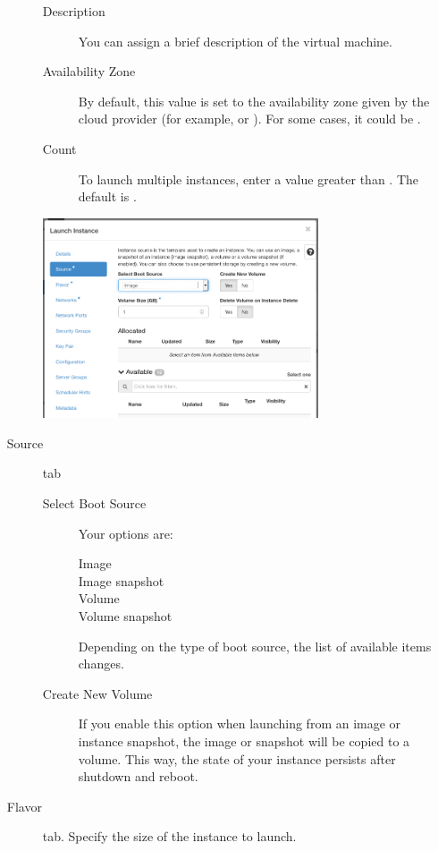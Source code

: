 \begin{enumerate}
\begin{description}
\begin{description}
    \item[Description] You can assign a brief description of the
      virtual machine.
    \item[Availability Zone] By default, this value is set to the
      availability zone given by the cloud provider (for example,
       or ).  For some cases, it
      could be .
    \item[Count] To launch multiple instances, enter a value greater
      than . The default is .
    \end{description}

    \begin{center}
      \includegraphics[width=0.7\textwidth]{img/launch_instance_source}
    \end{center}
  \item[Source] tab
  \begin{description}
  \item[Select Boot Source] Your options are:
    \begin{description}
    \item[Image]
    \item[Image snapshot]
    \item[Volume]
    \item[Volume snapshot]
    \end{description}
    Depending on the type of boot source, the list of available items
    changes.

  \item[Create New Volume] If you enable this option when launching
    from an image or instance snapshot, the image or snapshot will be
    copied to a volume.  This way, the state of your instance persists
    after shutdown and reboot.
  \end{description}

\item[Flavor] tab. Specify the size of the instance to launch.


\end{description}
\end{enumerate}
